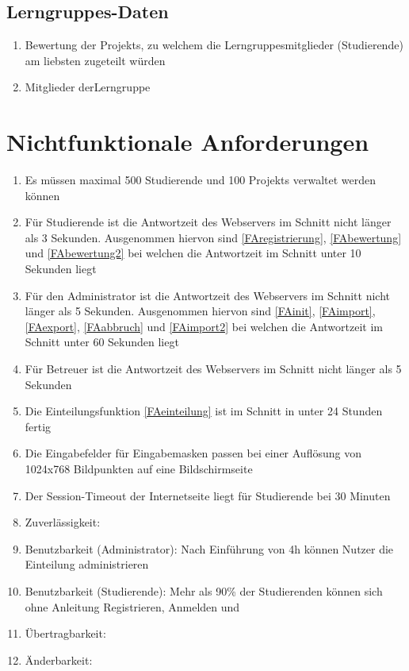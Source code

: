 \documentclass[parskip=full]{scrartcl}
\newcommand{\swtLabel}[1]{\textbf{/#1\arabic*0/}}
\begin{document}
\subsection{\glspl{Lerngruppe}-Daten} 
\begin{enumerate}[label=\swtLabel{D}, resume] 
  \item Bewertung der \glspl{Projekt}, zu welchem die \glspl{Lerngruppe}mitglieder
  (Studierende) am liebsten zugeteilt würden
  \item Mitglieder der\gls{Lerngruppe}
\end{enumerate}

\section{Nichtfunktionale Anforderungen}

\begin{enumerate}[label=\swtLabel{NF}]
  \item Es müssen maximal 500 Studierende und 100 \glspl{Projekt} verwaltet werden
  können
  \item Für Studierende ist die Antwortzeit des Webservers im Schnitt nicht
  länger als 3 Sekunden. Ausgenommen hiervon sind \ref{FAregistrierung}, 
  \ref{FAbewertung} und \ref{FAbewertung2} bei welchen die Antwortzeit im
  Schnitt unter 10 Sekunden liegt
  \item Für den Administrator ist die Antwortzeit des Webservers im Schnitt nicht
  länger als 5 Sekunden. Ausgenommen hiervon sind \ref{FAinit}, \ref{FAimport},
  \ref{FAexport}, \ref{FAabbruch} und \ref{FAimport2} bei welchen die Antwortzeit im Schnitt
  unter 60 Sekunden liegt
  \item Für Betreuer ist die Antwortzeit des Webservers im Schnitt nicht
  länger als 5 Sekunden
  \item Die Einteilungsfunktion \ref{FAeinteilung} ist im Schnitt in unter 24
  Stunden fertig
  \item Die Eingabefelder für Eingabemasken passen bei einer Auflösung von 
	1024x768 Bildpunkten auf eine Bildschirmseite
	\item Der Session-Timeout der Internetseite liegt für Studierende bei 30
	Minuten
	\item Zuverlässigkeit:  %
	\item Benutzbarkeit (Administrator): Nach Einführung von 4h können Nutzer die
	Einteilung administrieren
	\item Benutzbarkeit (Studierende): Mehr als 90\% der Studierenden können
	sich ohne Anleitung Registrieren, Anmelden und %
	\item Übertragbarkeit: %
	\item Änderbarkeit: %
	
 

\end{enumerate}
\end{document}
